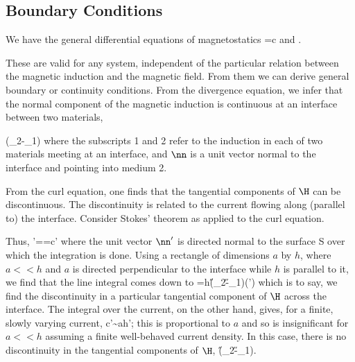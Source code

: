 {\subsection{Boundary Conditions}
We have the general differential equations of magnetostatics
\beq
\curl\Hx=\frac{4\pi}c\Jx
\eeq
and
\beq
\div{}.
\eeq

These are valid for any system, independent of the particular relation
between the magnetic induction and the magnetic field. From them we can
derive general boundary or continuity conditions. From the divergence
equation, we infer that the normal component of the magnetic induction is
continuous at an interface between two materials,

\centerline{}

\beq
(\B_2-\B_1)\cdot{}
\eeq
where the subscripts 1 and 2 refer to the induction in each of two
materials meeting at an interface, and $\nn$ is a unit vector normal to the
interface and pointing into medium 2.

From the curl equation, one finds that the tangential components of $\H$ can
be discontinuous. The discontinuity is related to the current flowing along
(parallel to) the interface. Consider Stokes' theorem as applied to the
curl equation. 

\centerline{}

\noindent Thus,
\beq
\ina[\curl\Hx]\cdot\nn'=\invlc\cdot\Hx=\frac{4\pi}c\ina\Jx\cdot\nn'
\eeq
where the unit vector $\nn'$ is directed normal to the surface S over which
the integration is done. Using a rectangle of dimensions $a$ by $h$, where
$a<<h$ and $a$ is directed perpendicular to the interface while $h$ is
parallel to it, we find that the line integral comes down to
\beq
\invlc\cdot\Hx=h(\H_2-\H_1)\cdot(\nn'\times\nn)
\eeq
which is to say, we find the discontinuity in a particular tangential
component of $\H$ across the interface. The integral over the current, on
the other hand, gives, for a finite, slowly varying current,
\beq
\frac{4\pi}c\ina\Jx\cdot\nn'\sim ah\J\cdot\nn';
\eeq
this is proportional to $a$ and so is insignificant for $a<<h$ assuming a
finite well-behaved current density. In this case, there is no
discontinuity in the tangential components of $\H$,
\beq
(\H_2-\H_1)\times{}.
\eeq

}
